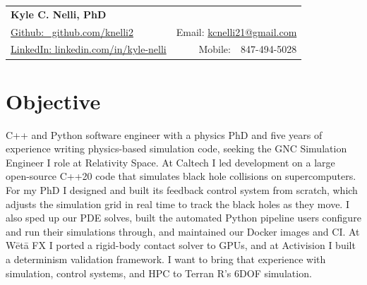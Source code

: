 \documentclass[a4paper,20pt]{article}
\begin{document}
\begin{tabular*}{\textwidth}{l@{\extracolsep{\fill}}r}
  \textbf{{\LARGE Kyle C. Nelli, PhD}}\\
  \href{https://github.com/knelli2}{Github: ~github.com/knelli2} &
   Email: \href{mailto:}{kcnelli21@gmail.com} \\
  \href{https://www.linkedin.com/in/kyle-nelli}{LinkedIn: linkedin.com/in/kyle-nelli} &
   Mobile:~~847-494-5028 \\
\end{tabular*}


\section{Objective}
C++ and Python software engineer with a physics PhD and five years of
experience writing physics-based simulation code, seeking the GNC Simulation
Engineer I role at Relativity Space. At Caltech I led development on a large
open-source C++20 code that simulates black hole collisions on supercomputers.
For my PhD I designed and built its feedback control system from scratch, which
adjusts the simulation grid in real time to track the black holes as they move.
I also sped up our PDE solves, built the automated Python pipeline users
configure and run their simulations through, and maintained our Docker images
and CI. At W\={e}t\={a} FX I ported a rigid-body contact solver to GPUs,
and at Activision I built a determinism validation framework. I want to bring
that experience with simulation, control systems, and HPC to Terran R's 6DOF
simulation.


\end{document}
